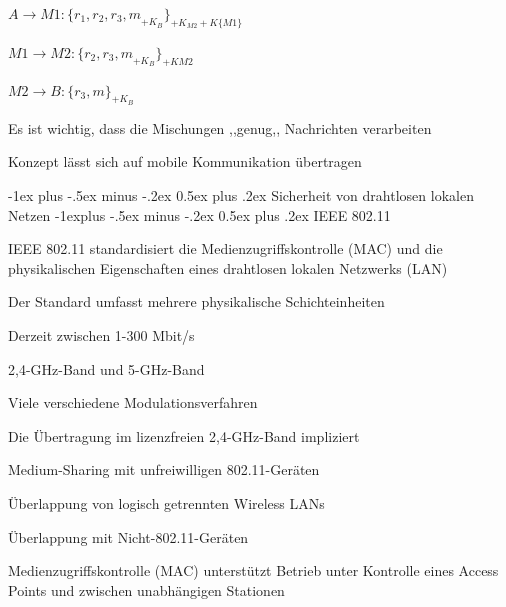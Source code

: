 \documentclass[a4paper]{article}
\makeatletter
\renewcommand{\section}{\@startsection{section}{1}{0mm}%
 {-1ex plus -.5ex minus -.2ex}%
 {0.5ex plus .2ex}%
 {\normalfont\large\bfseries}}
\renewcommand{\subsection}{\@startsection{subsection}{2}{0mm}%
 {-1explus -.5ex minus -.2ex}%
 {0.5ex plus .2ex}%
 {\normalfont\normalsize\bfseries}}
\makeatother
\begin{document}
\begin{multicols}{3}
\begin{itemize*}
\begin{itemize*}
                  \begin{itemize*}
                        \item $A\rightarrow M1: \{r_1 ,{r_2 ,{r_3 , m}_{+K_B}}\}_{+K_{M2} +K\{M1\}}$
                        \item $M1\rightarrow M2:\{r_2 ,{r_3 , m}_{+K_B}\}_{+K{M2}}$
                        \item $M2\rightarrow B: \{r_3 , m\}_{+K_B}$
                  \end{itemize*}
                  \item Es ist wichtig, dass die Mischungen ,,genug,, Nachrichten verarbeiten
                  \item Konzept lässt sich auf mobile Kommunikation übertragen
            \end{itemize*}
      \end{itemize*}

      \section{Sicherheit von drahtlosen lokalen Netzen}
      \subsection{IEEE 802.11}
      \begin{itemize*}
            \item IEEE 802.11 standardisiert die Medienzugriffskontrolle (MAC) und die physikalischen Eigenschaften eines drahtlosen lokalen Netzwerks (LAN)
            \item Der Standard umfasst mehrere physikalische Schichteinheiten
            \begin{itemize*}
                  \item Derzeit zwischen 1-300 Mbit/s
                  \item 2,4-GHz-Band und 5-GHz-Band
                  \item Viele verschiedene Modulationsverfahren
            \end{itemize*}
            \item Die Übertragung im lizenzfreien 2,4-GHz-Band impliziert
            \begin{itemize*}
                  \item Medium-Sharing mit unfreiwilligen 802.11-Geräten
                  \item Überlappung von logisch getrennten Wireless LANs
                  \item Überlappung mit Nicht-802.11-Geräten
            \end{itemize*}
            \item Medienzugriffskontrolle (MAC) unterstützt Betrieb unter Kontrolle eines Access Points und zwischen unabhängigen Stationen
      \end{itemize*}


\end{multicols}
\end{document}
